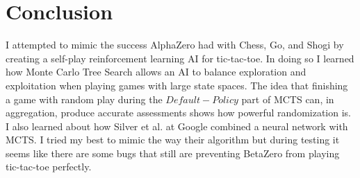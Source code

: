 \documentclass[letterpaper]{article} %
\begin{document}
  \section{Conclusion}
  I attempted to mimic the success AlphaZero had with Chess, Go, and Shogi by
  creating a self-play reinforcement learning AI for tic-tac-toe. In doing so I
  learned how Monte Carlo Tree Search allows an AI to balance exploration and
  exploitation when playing games with large state spaces. The idea that
  finishing a game with random play during the $Default-Policy$ part of MCTS
  can, in aggregation, produce accurate assessments shows how powerful
  randomization is. I also learned about how Silver et al. at Google combined a
  neural network with MCTS. I tried my best to mimic the way their algorithm
  but during testing it seems like there are some bugs that still are preventing
  BetaZero from playing tic-tac-toe perfectly.
  

{}

\end{document}
